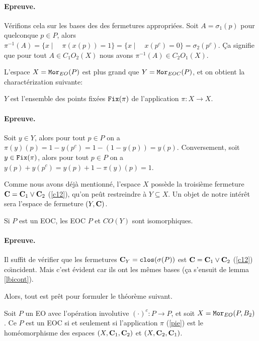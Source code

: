 \paragraph{Epreuve.} V\'erifions cela sur les bases des des 
fermetures appropri\'ees. Soit $A=\sigma_1(p)$ pour quelconque 
$p\in P$, alors $\pi^{-1}(A)=\{x\mid\quad 
\pi(x(p))=1\}=\{x\mid\quad x(p^c)=0\}=\sigma_2(p^c)$. \c Ca 
signifie que pour tout $A\in C_1O_2(X)$ nous avons $\pi^{-1}(A)\in 
C_2O_1(X)$. 
\endproof 

L'espace $X={\tt Mor}_{EO}(P)$ est plus grand que $Y={\tt Mor}_{EOC}(P)$, et 
on obtient la charact\'erization suivante: 

\begin{lemma} $Y$ est l'ensemble des points fix\'ees ${\tt Fix}(\pi)$ de 
l'application $\pi:X\to X$. \label{lfix} 
\end{lemma} 

\paragraph{Epreuve.} Soit $y\in Y$, alors pour tout $p\in P$ 
on a $\pi(y)(p)=1-y(p^c)=1-(1-y(p))=y(p)$. Conversement, soit 
$y\in{\tt Fix}(\pi)$, alors pour tout $p\in P$ on a $y(p)+y(p^c)= 
y(p)+1-\pi(y)(p)=1$. \endproof 

Comme nous avons d\'ej\`a mentionn\'e, l'espace $X$ poss\`ede la 
troisi\`eme fermeture ${\bf C}={\bf C}_1\lor{\bf C}_2$ (\ref{c12}), qu'on pe\^ut 
restreindre \`a $Y\subseteq X$. Un objet de notre int\'er\^et sera 
l'espace de fermeture $(Y,{\bf C})$. 

\begin{lemma} Si $P$ est un EOC, les EOC $P$ et $CO(Y)$ sont 
isomorphiques. 
\end{lemma} 

\paragraph{Epreuve.} Il suffit de v\'erifier que les fermetures 
${\bf C}_Y={\tt clos}(\sigma(P))$ est ${\bf C}={\bf C}_1\lor{\bf C}_2$ (\ref{c12}) 
co\"\i ncident. Mais c'est \'evident car ils ont les m\^emes bases 
(\c ca s'ensuit de lemma \ref{lbicont}). \endproof 

Alors, tout est pr\^et pour formuler le th\'eor\`eme suivant. 

\begin{th} Soit $P$ un EO avec l'op\'eration involutive 
$(\cdot)^c:P\to P$, et soit $X={\tt Mor}_{EO}(P,B_2)$. Ce $P$ est un EOC 
si et seulement si l'application $\pi$ (\ref{pie}) est le hom\'eomorphisme des 
espaces $(X,{\bf C}_1,{\bf C}_2)$ et $(X,{\bf C}_2,{\bf C}_1)$. 
\end{th} 

